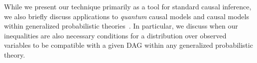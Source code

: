 
While we present our technique primarily as a tool for standard causal inference, we also briefly discuss applications to {\em quantum} causal models and causal models within generalized probabilistic theories~\cite{fritz2012bell,pusey2014gdag,chaves2014informationinference,BeyondBellII}.  In particular, we discuss when our inequalities are also necessary conditions for a distribution over observed variables to be compatible with a given DAG within any generalized probabilistic theory. 




